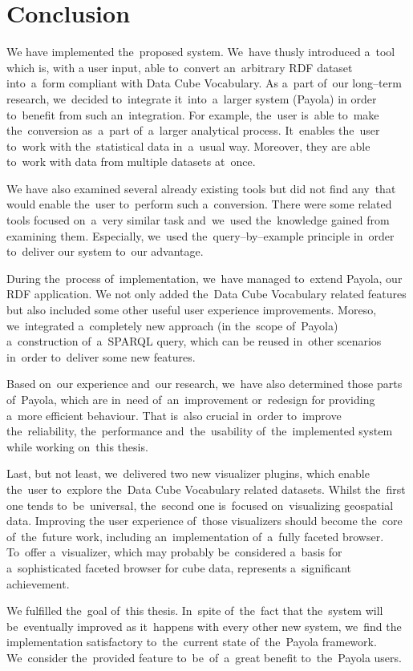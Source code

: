 \chapter*{Conclusion}

We have implemented the~proposed system. We~have thusly introduced a~tool which is, with
a user input, able to~convert an~arbitrary RDF dataset into~a~form compliant with Data Cube Vocabulary.
As a~part of~our long--term research, we~decided to~integrate it~into~a~larger system (Payola)
in order to~benefit from such an~integration.
For example, the~user is~able to~make the~conversion as~a~part of~a~larger 
analytical process. It~enables the~user to~work with the~statistical data in~a~usual way. Moreover, they are able to~work with data from multiple datasets at~once.

We have also examined several already existing tools but did not find any~that would 
enable the~user to~perform such a~conversion. There were some related tools 
focused on~a~very similar task and~we~used the~knowledge gained from
examining them. Especially, we~used the~query--by--example principle in~order to~deliver our system
to~our advantage.

During the~process of~implementation, we~have managed to~extend Payola, our RDF application. 
We not only added the~Data Cube Vocabulary related features but also included some 
other useful user experience improvements. Moreso, we~integrated a~completely 
new approach (in the~scope of~Payola) a~construction of~a~SPARQL query, which can 
be reused in~other scenarios in~order to~deliver some new features.

Based on~our experience and~our research, we~have also determined those parts of~Payola,
which are in~need of~an~improvement or~redesign for providing a~more 
efficient behaviour. That is~also crucial in~order to~improve the~reliability, 
the~performance and~the~usability of~the~implemented system while working on~this 
thesis.

Last, but not least, we~delivered two new visualizer plugins, which enable the~user to~explore the~Data Cube Vocabulary related datasets. Whilst the~first one tends to~be~universal, the~second one is~focused on~visualizing geospatial data. Improving 
the user experience of~those visualizers should become the~core of~the~future work, 
including an~implementation of~a~fully faceted browser. To~offer a~visualizer,
which may probably be~considered a~basis for a~sophisticated faceted browser for cube data,
represents a~significant achievement.

We fulfilled the~goal of~this thesis. In~spite of~the~fact that the~system will be~eventually improved
as it~happens with every other new system, we~find
the implementation satisfactory to~the~current state of~the~Payola framework. We~consider the~provided feature to~be~of~a~great benefit to~the~Payola users.
